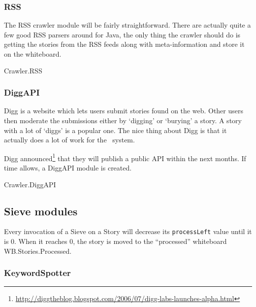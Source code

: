 \subsubsection{RSS}

The RSS crawler module will be fairly straightforward. There are actually quite
a few good RSS parsers around for Java, the only thing the crawler should do is
getting the stories from the RSS feeds along with meta-information and store it
on the whiteboard.

\begin{module}{Crawler.RSS}
\end{module}

\subsubsection{DiggAPI}

Digg is a website which lets users submit stories found on the web. Other users
then moderate the submissions either by `digging' or `burying' a story. A story
with a lot of `diggs' is a popular one. The nice thing about Digg is that it
actually does a lot of work for the \Amber\ system.

Digg
announced\footnote{\url{http://diggtheblog.blogspot.com/2006/07/digg-labs-launches-alpha.html}}
that they will publish a public API within the next months. If time allows, a
DiggAPI module is created.

\begin{module}{Crawler.DiggAPI}
\end{module}

% 

\subsection{Sieve modules}

Every invocation of a Sieve on a Story will decrease its \texttt{processLeft}
value until it is 0. When it reaches 0, the story is moved to the ``processed''
whiteboard WB.Stories.Processed.

\subsubsection{KeywordSpotter}

